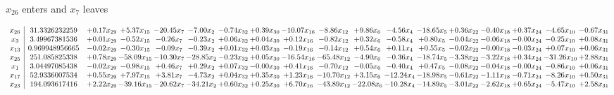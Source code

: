 \documentclass[9pt]{article}
\begin{document}
 $ x_{26} $ enters and $ x_{7} $ leaves 

 \[\begin{array}{c| c c@{\hskip 2pt} c@{\hskip 2pt} c@{\hskip 2pt} c@{\hskip 2pt} c@{\hskip 2pt} c@{\hskip 2pt} c@{\hskip 2pt} c@{\hskip 2pt} c@{\hskip 2pt} c@{\hskip 2pt} c@{\hskip 2pt} c@{\hskip 2pt} c@{\hskip 2pt} c@{\hskip 2pt} c@{\hskip 2pt} c@{\hskip 2pt} }
 x_{26}   &  31.3326232259 & +  0.17 x_{29} & +  5.37 x_{15} & -20.45 x_{7} & -7.00 x_{2} & -0.74 x_{32} & +  0.39 x_{30} & -10.07 x_{16} & -8.86 x_{12} & +  9.86 x_{6} & -4.56 x_{4} & -18.65 x_{5} & +  0.36 x_{22} & -0.40 x_{18} & +  0.37 x_{24} & -4.65 x_{10} & -0.67 x_{31}\\
 x_{3}   &  3.49967381536 & +  0.01 x_{29} & -0.52 x_{15} & -0.26 x_{7} & -0.23 x_{2} & +  0.06 x_{32} & +  0.04 x_{30} & +  0.12 x_{16} & -0.82 x_{12} & +  0.32 x_{6} & -0.58 x_{4} & +  0.80 x_{5} & -0.04 x_{22} & -0.06 x_{18} & -0.00 x_{24} & -0.25 x_{10} & +  0.08 x_{31}\\
 x_{13}   &  0.969948956665 & -0.02 x_{29} & -0.30 x_{15} & -0.09 x_{7} & -0.39 x_{2} & +  0.01 x_{32} & +  0.03 x_{30} & -0.19 x_{16} & -0.14 x_{12} & +  0.54 x_{6} & +  0.11 x_{4} & +  0.55 x_{5} & -0.02 x_{22} & -0.00 x_{18} & -0.03 x_{24} & +  0.07 x_{10} & +  0.06 x_{31}\\
 x_{25}   &  251.085825338 & +  0.78 x_{29} & -58.09 x_{15} & -10.30 x_{7} & -28.85 x_{2} & -0.23 x_{32} & +  0.05 x_{30} & -16.54 x_{16} & -65.48 x_{12} & -4.90 x_{6} & -0.36 x_{4} & -18.74 x_{5} & -3.38 x_{22} & -3.22 x_{18} & +  0.34 x_{24} & -31.26 x_{10} & +  2.88 x_{31}\\
 x_{1}   &  3.04497085438 & -0.02 x_{29} & -0.98 x_{15} & +  0.46 x_{7} & +  0.29 x_{2} & +  0.07 x_{32} & -0.00 x_{30} & +  0.41 x_{16} & -0.70 x_{12} & -0.05 x_{6} & -0.40 x_{4} & +  0.47 x_{5} & -0.08 x_{22} & -0.04 x_{18} & -0.00 x_{24} & -0.86 x_{10} & +  0.06 x_{31}\\
 x_{17}   &  52.9336007534 & +  0.55 x_{29} & +  7.97 x_{15} & +  3.81 x_{7} & -4.73 x_{2} & +  0.04 x_{32} & +  0.35 x_{30} & +  1.23 x_{16} & -10.70 x_{12} & +  3.15 x_{6} & -12.24 x_{4} & -18.98 x_{5} & -0.61 x_{22} & -1.11 x_{18} & -0.71 x_{24} & -8.26 x_{10} & +  0.50 x_{31}\\
 x_{23}   &  194.093617416 & +  2.22 x_{29} & -39.16 x_{15} & -20.62 x_{7} & -34.21 x_{2} & +  0.60 x_{32} & +  0.25 x_{30} & +  6.70 x_{16} & -43.89 x_{12} & -22.08 x_{6} & -10.28 x_{4} & -14.89 x_{5} & -3.01 x_{22} & -2.62 x_{18} & +  0.65 x_{24} & -5.47 x_{10} & +  2.58 x_{31}\\

\end{array}\]
\end{document}
